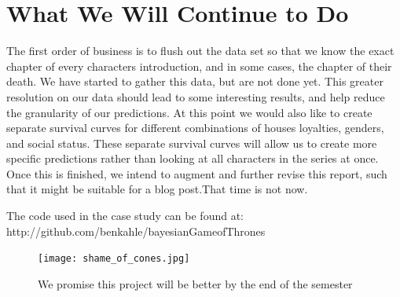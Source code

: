\documentclass{article}
\begin{document}
\section{What We Will Continue to Do}
The first order of business is to flush out the data set so that we know the exact chapter of every characters introduction, and in some cases, the chapter of their death. We have started to gather this data, but are not done yet. This greater resolution on our data should lead to some interesting results, and help reduce the granularity of our predictions. At this point we would also like to create separate survival curves for different combinations of houses loyalties, genders, and social status. These separate survival curves will allow us to create more specific predictions rather than looking at all characters in the series at once. Once this is finished, we intend to augment and further revise this report, such that it might be suitable for a blog post.That time is not now.

The code used in the case study can be found at: \\
http://github.com/benkahle/bayesianGameofThrones
\begin{figure}[ht!]
\centering
\texttt{[image: shame\_of\_cones.jpg]}
\caption{We promise this project will be better by the end of the semester}
\end{figure}
\end{document}

